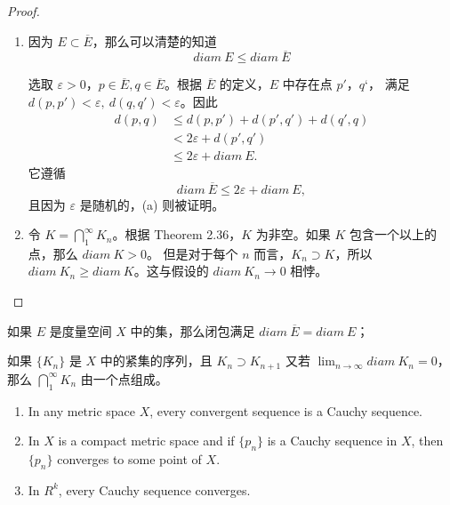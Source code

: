 \documentclass[../poma-notes.tex]{subfiles}
\begin{document}
\begin{proof}
  \begin{enumerate}[label=(\alph*)]
    \item 因为 $E \subset \overline{E}$，那么可以清楚的知道
          \[diam\ E \le diam\ \overline{E}\]

          选取 $\varepsilon > 0$，$p \in \overline{E}, q \in \overline{E}$。根据 $\overline{E}$ 的定义，$E$ 中存在点 $p'$，$q‘$，
          满足 $d(p,p') < \varepsilon,\ d(q,q') < \varepsilon$。因此
          \begin{align*}
            \mathcal{} d(p,q) & \le d(p,p') + d(p',q') + d(q',q) \\
                              & < 2\varepsilon + d(p',q')        \\
                              & \le 2\varepsilon + diam\ E.
          \end{align*}
          它遵循
          \[diam\ \overline{E} \le 2\varepsilon + diam\ E,\]
          且因为 $\varepsilon$ 是随机的，(a) 则被证明。
    \item 令 $K = \bigcap_1^{\infty} K_n$。根据 Theorem 2.36，$K$ 为非空。如果 $K$ 包含一个以上的点，那么 $diam\ K > 0$。
          但是对于每个 $n$ 而言，$K_n \supset K$，所以 $diam\ K_n \ge diam\ K$。这与假设的 $diam\ K_n \to 0$ 相悖。
  \end{enumerate}
\end{proof}


\begin{anote}
  \begin{enumerate*}[label=(\alph*)]
    \item 如果 $E$ 是度量空间 $X$ 中的集，那么闭包满足 $diam\ \overline{E} = diam\ E$；
    \item 如果 $\{K_n\}$ 是 $X$ 中的紧集的序列，且 $K_n \supset K_{n+1}$ 又若 $\lim_{n \to \infty} diam\ K_n = 0$，
          那么 $\bigcap_1^{\infty} K_n$ 由一个点组成。
  \end{enumerate*}
\end{anote}

\begin{theorem}\mbox{}
  \begin{enumerate}
    \item In any metric space $X$, every convergent sequence is a Cauchy sequence.
    \item In $X$ is a compact metric space and if $\{p_n\}$ is a Cauchy sequence in $X$, then $\{p_n\}$ converges to
          some point of $X$.
    \item In $R^k$, every Cauchy sequence converges.
  \end{enumerate}
\end{theorem}
\end{document}

